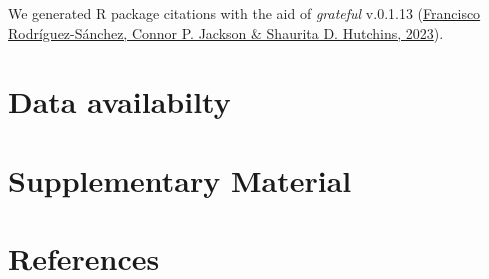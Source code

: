 \documentclass[10pt,a4paper]{article}
\begin{document}
We generated R package citations with the aid of \emph{grateful} v.0.1.13 (\protect\hyperlink{ref-grateful}{Francisco Rodríguez-Sánchez, Connor P. Jackson \& Shaurita D. Hutchins, 2023}).

\hypertarget{data-availabilty}{%
\section{Data availabilty}\label{data-availabilty}}

\hypertarget{supplementary-material}{%
\section{Supplementary Material}\label{supplementary-material}}

\hypertarget{references}{%
\section*{References}\label{references}}
\end{document}

